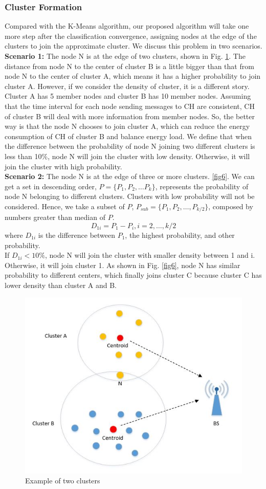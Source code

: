 \documentclass[11pt]{report}
\begin{document}
	
	\subsubsection{Cluster Formation}
	 Compared with the K-Means algorithm, our proposed algorithm will take one more step after the classification convergence, assigning nodes at the edge of the clusters to join the approximate cluster. We discuss this problem in two scenarios.\\
	 \textbf{Scenario 1:} The node N is at the edge of two clusters, shown in Fig. \ref{fig5}. The distance from node N to the center of cluster B is a little bigger than that from node N to the center of cluster A, which means it has a higher probability to join cluster A. However, if we consider the density of cluster, it is a different story. Cluster A has 5 member nodes and cluster B has 10 member nodes. Assuming that the time interval for each node sending messages to CH are consistent, CH of cluster B will deal with more information from member nodes. So, the better way is that the node N chooses to join cluster A, which can reduce the energy consumption of CH of cluster B and balance energy load. We define that when the difference between the probability of node N joining two different clusters is less than 10$\%$, node N will join the cluster with low density. Otherwise, it will join the cluster with high probability.\\
	 \textbf{Scenario 2:} The node N is at the edge of three or more clusters. \ref{fig6}. We can get a set in descending order, $P = \{P_1,P_2, \dots P_k \}$, represents the probability of node N belonging to different clusters. Clusters with low probability will not be considered. Hence, we take a subset of $P$, $P_{sub} = \{P_1, P_2, \dots, P_{k/2} \}$, composed by numbers greater than median of $P$. 
	 \begin{equation}
	 D_{1i} = P_1-P_i, i=2,\dots,k/2
	 \end{equation}
	 where $ D_{1i}$ is the difference between $P_1$, the highest probability, and other probability.\\
	 If $ D_{1i} < 10\%$, node N will join the cluster with smaller density between 1 and i. Otherwise, it will join cluster 1. As shown in Fig. \ref{fig6}, node N has similar probability to different centers, which finally joins cluster C because cluster C has lower density than cluster A and B.  
	 \begin{figure}[h!] 
	 	\centering
	 	\includegraphics[width=0.6\linewidth]{twoedge.jpg}
	 	\caption{Example of two clusters}
	 	\label{fig5}
	 \end{figure}
\end{document}
